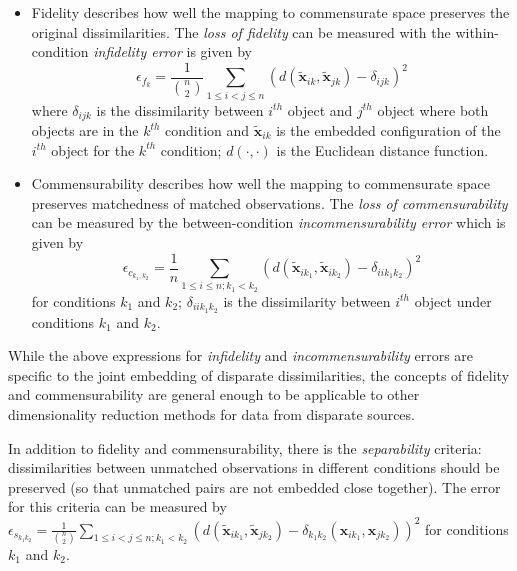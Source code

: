 \documentclass[11pt]{article} %
\begin{document}
\begin{itemize}
\item Fidelity describes how well the mapping to commensurate space preserves the original dissimilarities. The \emph{loss of fidelity} can be measured with the  within-condition \emph{ infidelity error} is given by
    \[
\epsilon_{f_{k}} = \frac{1}{{{n}\choose{2}}} \sum_{1 \leq i < j \leq n} (d(\widetilde{\bm{x}}_{ik},\widetilde{\bm{x}}_{jk})-\delta_{ijk})^2
\] 
where $\delta_{ijk}$ is the dissimilarity between $i^{th}$ object and $j^{th}$ object where both objects are in the $k^{th}$  condition and $\widetilde{\bm{x}}_{ik}$ is the embedded configuration of the $i^{th}$ object  for the $k^{th}$ condition;  $d(\cdot,\cdot)$ is the Euclidean distance function.

\item Commensurability describes how well the mapping to commensurate space preserves matchedness of matched observations. The \emph{loss of commensurability} can be measured by the between-condition {\em incommensurability error} which is given by
    \[
\epsilon_{c_{k_1,k_2}} = \frac{1}{n} \sum_{1 \leq i \leq n;k_1 <k_2} (d(\widetilde{\bm{x}}_{ik_1},\widetilde{\bm{x}}_{ik_2})- { \delta_{iik_1k_2}})^2
\label{comm-error}
\]
 for conditions $k_1$ and $k_2$; $\delta_{iik_1k_2}$  is the dissimilarity between $i^{th}$ object under  conditions   $k_1$ and  $k_2$.
\end{itemize}

While  the above expressions for  \emph{infidelity} and  \emph{incommensurability} errors  are specific to the joint embedding of disparate dissimilarities, the concepts of fidelity and commensurability are  general enough to be applicable to other dimensionality reduction methods for data from disparate sources. 

 In addition to fidelity and commensurability, there is the \emph{separability} criteria:  dissimilarities between unmatched  observations in different conditions  should be preserved (so that unmatched pairs are not embedded close together).  The error for this criteria can be measured by  $\epsilon_{s_{k_1k_2}} = \frac{1}{{{n}\choose{2}}} \sum_{1 \leq i < j \leq n;k_1 <k_2} (d(\widetilde{\bm{x}}_{ik_1},\widetilde{\bm{x}}_{jk_2})-{ \delta_{k_1k_2}}(\bm{x}_{ik_1},\bm{x}_{jk_2}))^2$ for  conditions   $k_1$ and  $k_2$.
\end{document}
